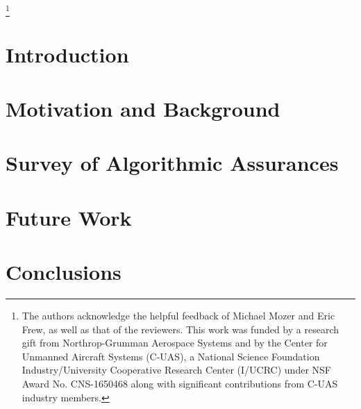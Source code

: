 \documentclass[format=manuscript, screen,review=true]{acmart}
\begin{document}

\thanks{The authors acknowledge the helpful feedback of Michael Mozer and Eric Frew, as well as that of the reviewers. This work was funded by a research gift from Northrop-Grumman Aerospace Systems and by the Center for Unmanned Aircraft Systems (C-UAS), a National Science Foundation Industry/University Cooperative Research Center (I/UCRC) under NSF Award No. CNS-1650468 along with significant contributions from C-UAS industry members.}

\maketitle

\section{Introduction}\label{sec:introduction}


\section{Motivation and Background} \label{sec:background}


\section{Survey of Algorithmic Assurances} \label{sec:synthesis}


\section{Future Work} \label{sec:future_work}


\section{Conclusions}\label{sec:conclusions}




\end{document}
